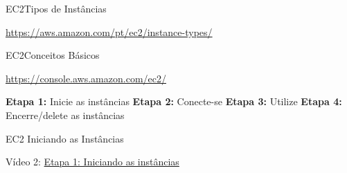 \documentclass[xcolor=table]{beamer}
\begin{document}
\begin{frame}[c]{EC2}{Tipos de Instâncias}


        \begin{outline}
            \1[]\url{https://aws.amazon.com/pt/ec2/instance-types/}
        \end{outline}
        
      
            \begin{outline}          
            \begin{figure}
                \hfill
            \end{figure}
            
            
            \end{outline}
       
\end{frame}


\begin{frame}[c]{EC2}{Conceitos Básicos}

        \begin{outline}
            \1[]\url{https://console.aws.amazon.com/ec2/}
        \end{outline}
        
        
        \begin{center}
            \begin{outline}                
               \1[] \textbf{Etapa 1:} Inicie as instâncias
               \1[] \textbf{Etapa 2:} Conecte-se 
               \1[] \textbf{Etapa 3:} Utilize
               \1[] \textbf{Etapa 4:} Encerre/\alert{delete} as instâncias
            \end{outline}
        \end{center}

\end{frame}


\begin{frame}[c]{EC2} {Iniciando as Instâncias}

        \begin{center}
            Vídeo 2: \href{run:./2_running.ogv}{Etapa 1: Iniciando as instâncias}
        \end{center}  

\end{frame}
\end{document}

